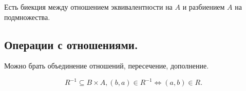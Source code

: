 \begin{proposition}
    Есть биекция между отношением эквивалентности на $A$ и разбиением $A$ на подмножества.
\end{proposition}

\subsection{Операции с отношениями.}

Можно брать объединение отношений, пересечение, дополнение.

\begin{definition}
    $$R^{-1} \subseteq B \times A, (b, a) \in R^{-1} \Longleftrightarrow (a, b) \in R.$$
\end{definition}